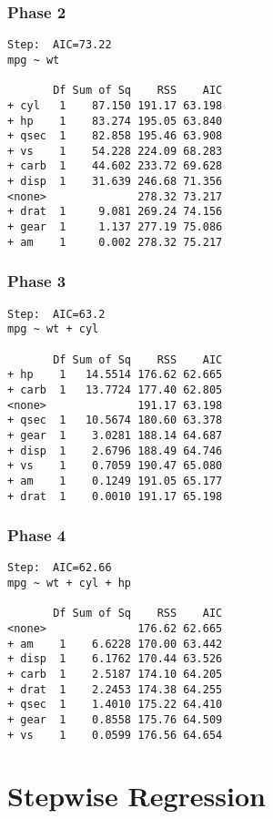 \subsubsection{Phase 2}
\footnotesize
\begin{verbatim}
Step:  AIC=73.22
mpg ~ wt

       Df Sum of Sq    RSS    AIC
+ cyl   1    87.150 191.17 63.198
+ hp    1    83.274 195.05 63.840
+ qsec  1    82.858 195.46 63.908
+ vs    1    54.228 224.09 68.283
+ carb  1    44.602 233.72 69.628
+ disp  1    31.639 246.68 71.356
<none>              278.32 73.217
+ drat  1     9.081 269.24 74.156
+ gear  1     1.137 277.19 75.086
+ am    1     0.002 278.32 75.217
\end{verbatim}
\normalsize
\subsubsection{Phase 3}
\footnotesize
\begin{verbatim}
Step:  AIC=63.2
mpg ~ wt + cyl

       Df Sum of Sq    RSS    AIC
+ hp    1   14.5514 176.62 62.665
+ carb  1   13.7724 177.40 62.805
<none>              191.17 63.198
+ qsec  1   10.5674 180.60 63.378
+ gear  1    3.0281 188.14 64.687
+ disp  1    2.6796 188.49 64.746
+ vs    1    0.7059 190.47 65.080
+ am    1    0.1249 191.05 65.177
+ drat  1    0.0010 191.17 65.198
\end{verbatim}
\normalsize
\subsubsection{Phase 4}
\footnotesize
\begin{verbatim}
Step:  AIC=62.66
mpg ~ wt + cyl + hp

       Df Sum of Sq    RSS    AIC
<none>              176.62 62.665
+ am    1    6.6228 170.00 63.442
+ disp  1    6.1762 170.44 63.526
+ carb  1    2.5187 174.10 64.205
+ drat  1    2.2453 174.38 64.255
+ qsec  1    1.4010 175.22 64.410
+ gear  1    0.8558 175.76 64.509
+ vs    1    0.0599 176.56 64.654
\end{verbatim}
\normalsize
\newpage
\section{Stepwise Regression}

